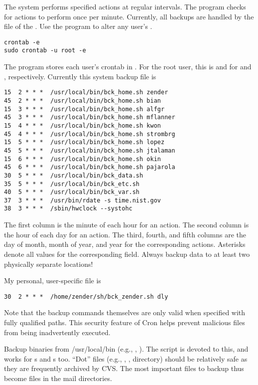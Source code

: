 \documentclass[12pt,twoside]{article}
\begin{document}
The  system performs specified actions at regular intervals.
The  program checks for actions to perform once per minute.
Currently, all backups are handled by the  file
of the .
Use the  program to alter any user's .
\begin{verbatim}
crontab -e
sudo crontab -u root -e
\end{verbatim}
The  program stores each user's crontab in
. 
For the root user, this is  and
 for  and
 , respectively.
Currently this system backup  file is
\begin{verbatim}
15  2 * * *  /usr/local/bin/bck_home.sh zender
45  2 * * *  /usr/local/bin/bck_home.sh bian
15  3 * * *  /usr/local/bin/bck_home.sh alfgr
45  3 * * *  /usr/local/bin/bck_home.sh mflanner
15  4 * * *  /usr/local/bin/bck_home.sh kwon
45  4 * * *  /usr/local/bin/bck_home.sh strombrg
15  5 * * *  /usr/local/bin/bck_home.sh lopez
45  5 * * *  /usr/local/bin/bck_home.sh jtalaman
15  6 * * *  /usr/local/bin/bck_home.sh okin
45  6 * * *  /usr/local/bin/bck_home.sh pajarola
30  5 * * *  /usr/local/bin/bck_data.sh
35  5 * * *  /usr/local/bin/bck_etc.sh
40  5 * * *  /usr/local/bin/bck_var.sh
37  3 * * *  /usr/bin/rdate -s time.nist.gov
38  3 * * *  /sbin/hwclock --systohc
\end{verbatim}
The first column is the minute of each hour for an action.
The second column is the hour of each day for an action.
The third, fourth, and fifth columns are the day of month, 
month of year, and year for the corresponding actions. 
Asterisks denote all values for the corresponding field.
Always backup data to at least two physically separate locations!

My personal, user-specific  file is
\begin{verbatim}
30  2 * * *  /home/zender/sh/bck_zender.sh dly
\end{verbatim}
Note that the backup commands themselves are only valid when specified
with fully qualified paths. 
This security feature of Cron helps prevent malicious files from being
inadvertently executed. 

Backup binaries from /usr/local/bin (e.g., , ).
The script  is devoted to this, and works for
s and s too.
``Dot'' files (e.g., , ,
 directory) should be relatively safe as they are
frequently archived by CVS. 
The most important files to backup thus become files in the mail
directories. 
\end{document}
